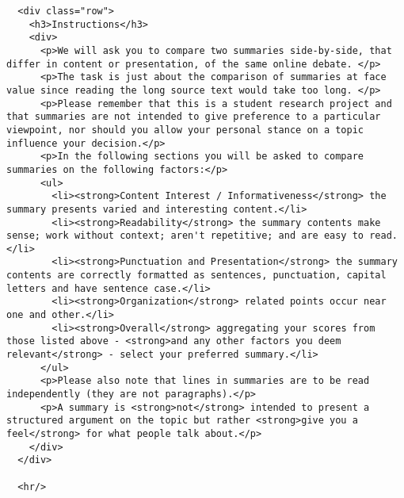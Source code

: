 \documentclass{article}
\begin{document}
\begin{verbatim}
  <div class="row">
    <h3>Instructions</h3>
    <div>
      <p>We will ask you to compare two summaries side-by-side, that differ in content or presentation, of the same online debate. </p>
      <p>The task is just about the comparison of summaries at face value since reading the long source text would take too long. </p>
      <p>Please remember that this is a student research project and that summaries are not intended to give preference to a particular viewpoint, nor should you allow your personal stance on a topic influence your decision.</p>
      <p>In the following sections you will be asked to compare summaries on the following factors:</p>
      <ul>
        <li><strong>Content Interest / Informativeness</strong> the summary presents varied and interesting content.</li>
        <li><strong>Readability</strong> the summary contents make sense; work without context; aren't repetitive; and are easy to read.</li>
        <li><strong>Punctuation and Presentation</strong> the summary contents are correctly formatted as sentences, punctuation, capital letters and have sentence case.</li>
        <li><strong>Organization</strong> related points occur near one and other.</li>
        <li><strong>Overall</strong> aggregating your scores from those listed above - <strong>and any other factors you deem relevant</strong> - select your preferred summary.</li>
      </ul>
      <p>Please also note that lines in summaries are to be read independently (they are not paragraphs).</p>
      <p>A summary is <strong>not</strong> intended to present a structured argument on the topic but rather <strong>give you a feel</strong> for what people talk about.</p>
    </div>
  </div>

  <hr/>


\end{verbatim}
\end{document}
